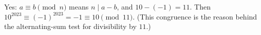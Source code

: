 Yes: $a\equiv b\pmod n$ means $n\mid a-b$, and $10-(-1)=11$. Then $10^{2023}\equiv(-1)^{2023}=-1\equiv\boxed{10}\pmod{11}$. (This congruence is the reason behind the alternating-sum test for divisibility by $11$.)

